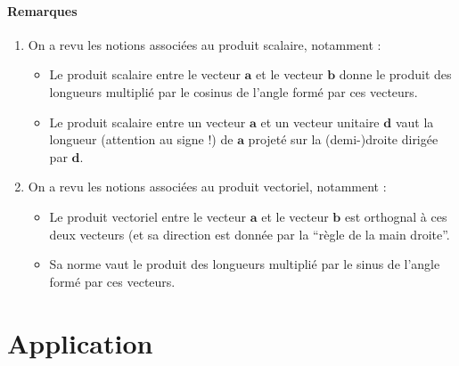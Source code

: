 \documentclass[a4paper,10pt]{article}
\begin{document}
\paragraph{Remarques}
\begin{enumerate}
 \item On a revu les notions associées au produit scalaire, notamment :
\begin{itemize}
 \item Le produit scalaire entre le vecteur $\mathbf{a}$ et le vecteur $\mathbf{b}$ donne le produit des longueurs multiplié par le cosinus de
l’angle formé par ces vecteurs.
\item Le produit scalaire entre un vecteur $\mathbf{a}$ et un vecteur unitaire $\mathbf{d}$ vaut la longueur (attention au signe !) de $\mathbf{a}$ projeté
sur la (demi-)droite dirigée par $\mathbf{d}$.
\end{itemize}

\item On a revu les notions associées au produit vectoriel, notamment :
\begin{itemize}
 \item Le produit vectoriel entre le vecteur $\mathbf{a}$ et le vecteur $\mathbf{b}$ est orthognal à ces deux vecteurs (et sa direction est donnée
par la ``règle de la main droite''.
\item Sa norme vaut le produit des longueurs multiplié par le sinus de l’angle formé par ces vecteurs.
\end{itemize}
\end{enumerate}

\section{Application}
\end{document}

